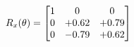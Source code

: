 \documentclass[preview]{standalone}
\begin{document}
\begin{align*}
\special{dvisvgm:raw <g id='unique000'>}R_{x}(\theta) = \begin{bmatrix}1 & 0 & 0 \\0 & +0.62 & +0.79 \\0 & -0.79 & +0.62\end{bmatrix}\special{dvisvgm:raw </g>}
\end{align*}
\end{document}

